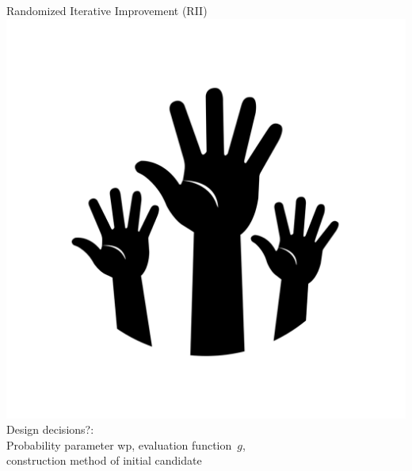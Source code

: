 \begin{frame}[c]{Randomized Iterative Improvement (RII)}
\medskip
\includegraphics[scale=.03]{images/hands.png}
\alert{Design decisions?}:\\
\pause Probability parameter wp, evaluation function~$g$,\\ construction method of initial candidate

\end{frame}
